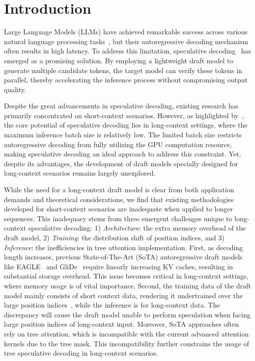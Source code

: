\vspace{-.5cm}
\section{Introduction}
\vspace{-.1cm}

Large Language Models (LLMs) have achieved remarkable success across various natural language processing tasks~\cite{achiam2023gpt}, but their autoregressive decoding mechanism often results in high latency. 
To address this limitation, speculative decoding~\cite{leviathan2023fast} has emerged as a promising solution.
By employing a lightweight draft model to generate multiple candidate tokens, the target model can verify these tokens in parallel, thereby accelerating the inference process without compromising output quality.

Despite the great advancements in speculative decoding, existing research has primarily concentrated on short-context scenarios. 
However, as highlighted by~\citet{chen2024magicdec}, the core potential of speculative decoding lies in long-context settings, where the maximum inference batch size is relatively low.
The limited batch size restricts autoregressive decoding from fully utilizing the GPU computation resource, making speculative decoding an ideal approach to address this constraint. 
Yet, despite its advantages, the development of draft models specially designed for long-context scenarios remains largely unexplored. 

While the need for a long-context draft model is clear from both application demands and theoretical considerations, we find that existing methodologies developed for short-context scenarios are inadequate when applied to longer sequences.
This inadequacy stems from three emergent challenges unique to long-context speculative decoding:
1) \textit{Architecture}: the extra memory overhead of the draft model, 2) \textit{Training}: the distribution shift of position indices, and 3) \textit{Inference}: the inefficiencies in tree attention implementation. 
First, as decoding length increases, previous State-of-The-Art (SoTA) autoregressive draft models like EAGLE~\cite{li2024eagle} and GliDe~\cite{du2024glide} require linearly increasing KV caches, resulting in substantial storage overhead. 
This issue becomes critical in long-context settings,
where memory usage is of vital importance. 
Second, the training data of the draft model mainly consists of short context data, rendering it undertrained over the large position indices~\cite{an2025does}, while the inference is for long-context data.
The discrepancy will cause the draft model unable to perform speculation when facing large position indices of long-context input.
Moreover, SoTA approaches often rely on tree attention, which is incompatible with the current advanced attention kernels due to the tree mask.
 This incompatibility further constrains the usage of tree speculative decoding in long-context scenarios.

